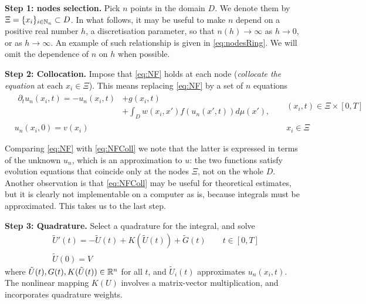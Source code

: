 \documentclass[a4paper]{siamart190516}
\begin{document}
\textbf{Step 1: nodes selection.} Pick $n$ points in the domain $D$. We denote them by
$\Xi = \{ x_i \}_{i \in \mathbb{N}_n} \subset D$.  In what follows, it may be useful to make $n$ depend on a positive real number
$h$, a discretisation parameter, so that $n(h) \to \infty$ as $h \to 0$, or as $h \to
\infty$. An example of such relationship is given in \cref{eq:nodesRing}. We will
omit the dependence of $n$ on $h$ when possible. 

\textbf{Step 2: Collocation.} 
Impose that \cref{eq:NF} holds at each node (\textit{collocate the equation} at
each $x_i \in \Xi$). This means replacing \cref{eq:NF} by a set of $n$ equations
\begin{equation}\label{eq:NFColl}
  \begin{aligned}
  &
  \begin{aligned}
    \partial_t u_n(x_i,t) =  -u_n(x_i,t) &+ g(x_i,t) \\
                & + \int_{D} w(x_i,x') f(u_n(x',t))d \mu(x'),
  \end{aligned}
  && (x_i,t) \in \Xi \times [0,T] \\
  & u_n(x_i,0) = v(x_i) && x_i \in \Xi 
  \end{aligned}
\end{equation}

Comparing \cref{eq:NF} with \cref{eq:NFColl} we note that the latter is expressed in
terms of the unknown $u_n$, which is an approximation to $u$: the two functions
satisfy evolution equations that coincide only at the nodes $\Xi$, not on the whole $D$.
Another observation is that \cref{eq:NFColl} may be useful for theoretical
estimates, but it is clearly not implementable on a computer as is, because integrals must be
approximated. This takes us to the last step.
  
\textbf{Step 3: Quadrature.} Select a quadrature for the integral, and solve
\begin{equation}%
  \begin{aligned}
   & \tilde U'(t) = -\tilde U(t) + K(\tilde U(t)) + \tilde G(t) \qquad  t \in [0,T]\\ 
   & \tilde U(0) = V
  \end{aligned}
\end{equation}  
where $\tilde U(t), G(t), K(\tilde U(t)) \in \mathbb{R}^n$ for all $t$, and $\tilde U_i(t)$ approximates
$u_n(x_i,t)$. The nonlinear mapping $K(U)$ involves a matrix-vector multiplication,
and incorporates quadrature weights.
\end{document}
